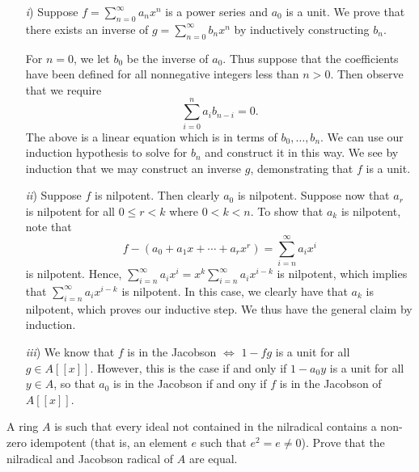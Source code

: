 \documentclass[10pt]{amsart}
\begin{document}
\begin{solution}
    \begin{itemize}
        \item[\emph{i})] Suppose $f = \sum_{n=0}^{\infty} a_nx^n$ is a power series and 
        $a_0$ is a unit. We prove that there exists an inverse of $g= \sum_{n=0}^{\infty}b_n x^n$ 
        by inductively constructing $b_n$.

        For $n=0$, we let $b_0$ be the inverse of $a_0$. Thus suppose that the coefficients have been 
        defined for all nonnegative integers less than $n > 0$. Then observe that 
        we require 
        \[
            \sum_{i=0}^n a_ib_{n-i} = 0.
        \]
        The above is a linear equation which is in terms of $b_0, \dots, b_n$.
        We can use our induction hypothesis to solve for $b_n$ and construct it in this way. We see 
        by induction that we may construct an inverse $g$, demonstrating that $f$ is a unit. 
    
        \item[\emph{ii})] Suppose $f$ is nilpotent. Then clearly $a_0$ is nilpotent. 
        Suppose now that $a_r$ is nilpotent for all $0 \le r < k$ where $0 < k < n$. 
        To show that $a_k$ is nilpotent, note that 
        \[
            f - (a_0 + a_1x + \cdots + a_{r}x^r) = \sum_{i = n}^{\infty}a_ix^i 
        \] 
        is nilpotent. Hence, $\sum_{i = n}^{\infty}a_ix^i  = x^k\sum_{i = n}^{\infty}a_ix^{i - k}$
        is nilpotent, which implies that $\sum_{i = n}^{\infty}a_ix^{i - k}$ is nilpotent. In this case, 
        we clearly have that $a_k$ is nilpotent, which proves our inductive step. We thus have the general 
        claim by induction. 

        \item[\emph{iii})] We know that $f$ is in the Jacobson $\iff$ 
        $1 - fg$ is a unit for all $g \in A[[x]]$. However, this is the case if and 
        only if $1 - a_0y$ is a unit 
        for all $y \in A$, so that $a_0$ is in the Jacobson if and ony if $f$ is in the Jacobson of $A[[x]]$.

          
          
         
    \end{itemize}
\end{solution}

\begin{exercise}
    A ring $A$ is such that every ideal not contained in the nilradical contains a non-zero idempotent (that is, an element $e$ 
    such that $e^2 = e  \ne 0$). Prove that the nilradical and Jacobson radical of $A$ are equal.
\end{exercise}
\end{document}
